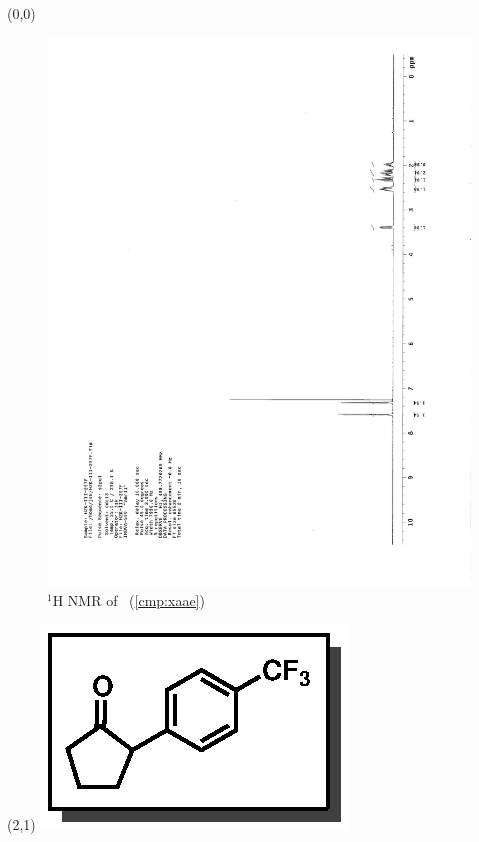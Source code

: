 \begin{textblock}{20}(0,0)
\begin{figure}[htb]
\caption{$^1$H NMR of \CMPxaae\ (\ref{cmp:xaae})}
\includegraphics[scale=0.75, trim = 0mm 0mm 0mm 5mm,
clip]{chp_asymmetric/images/nmr/xaaeH}
\vspace{-100pt}
\end{figure}
\end{textblock}
\begin{textblock}{1}(2,1)
\includegraphics[scale=0.8, angle=90]{chp_asymmetric/images/xaae}
\end{textblock}
